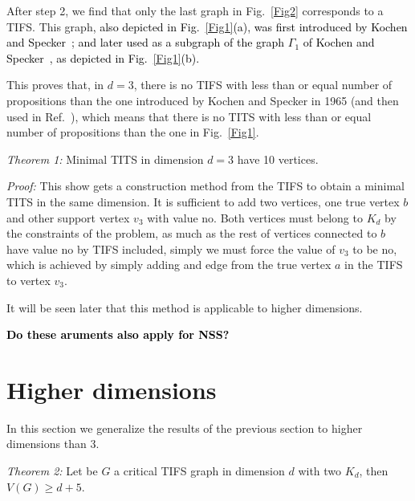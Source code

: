 \documentclass[%
  twocolumn,
 showpacs,
 showkeys,
 preprintnumbers,
 amsmath,amssymb,
 aps,
  pra,
  longbibliography,
 floatfix,
 ]{revtex4-1}
\newcommand{\karl}[1]{\textcolor{black}{#1}}
\def\endproof{ }
\begin{document}
After step 2, we find that only the last graph in Fig.~\ref{Fig2} corresponds to a TIFS.
This graph\karl{, also depicted in Fig.~\ref{Fig1}(a),
was first introduced
by Kochen and Specker~\cite[Fig.~1, p.~182]{code2};
and later used as a subgraph of the graph
$\Gamma_1$ of Kochen and Specker~\cite{KS67}, as depicted in Fig.~\ref{Fig1}(b).}

This proves that, in $d=3$, there is no TIFS with less than or equal number of propositions than
the one introduced by Kochen and Specker in 1965 \cite[Fig.~1, p.~182]{code2}
(and then used in Ref.~\cite{code4}),
which means that there is no TITS with less than or equal number of propositions than the one in Fig.~\ref{Fig1}.


{\em Theorem 1:} Minimal TITS in dimension $d=3$ have 10 vertices.


{\em Proof:} This show gets a construction method from the TIFS to obtain a minimal TITS in the same dimension.
It is sufficient to add two vertices, one true vertex $ b $ and other support vertex $ v_3 $ with value no.
Both vertices must belong to $K_d$ by the constraints of the problem, as much as the rest of vertices connected
to $ b $ have value no by TIFS included, simply we must force the value of $ v_3 $ to be no,
which is achieved by simply adding and edge from the true vertex $a$ in the TIFS to vertex $ v_3 $. \endproof

It will be seen later that this method is applicable to higher dimensions.


\karl{\bf Do these aruments also apply for NSS?}

\section{Higher dimensions}


In this section we generalize the results of the previous section to higher dimensions than 3.

{\em Theorem 2:} Let be $G$ a critical TIFS graph in dimension $d$ with two $K_d$, then $V(G) \geq d+5$.

\end{document}
